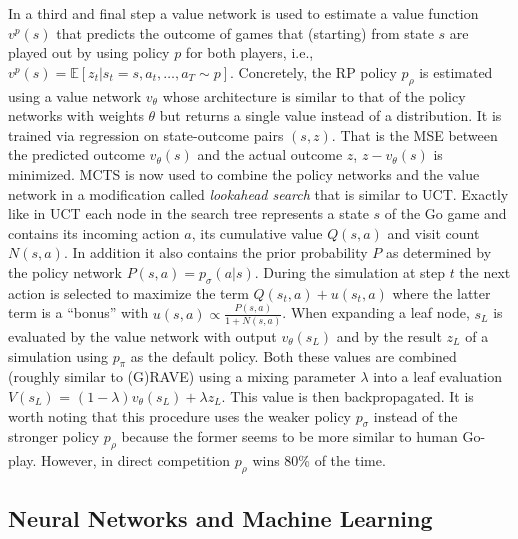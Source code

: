 In a third and final step a value network is used to estimate a value function $v^p(s)$ that predicts the outcome of games that (starting) from state $s$ are played out by using policy $p$ for both players, i.e., $v^p(s) = \mathbb{E}[z_t | s_t = s, a_t,\ldots,a_T \sim p]$. Concretely, the RP policy $p_\rho$ is estimated using a value network $v_\theta$ whose architecture is similar to that of the policy networks with weights $\theta$ but returns a single value instead of a distribution. It is trained via regression on state-outcome pairs $(s,z)$. That is the MSE between the predicted outcome $v_\theta(s)$ and the actual outcome $z$, $z-v_\theta(s)$ is minimized. MCTS is now used to combine the policy networks and the value network in a modification called \textit{lookahead search} that is similar to UCT. Exactly like in UCT each node in the search tree represents a state $s$ of the Go game and contains its incoming action $a$, its cumulative value $Q(s,a)$ and visit count $N(s,a)$. In addition it also contains the prior probability $P$ as determined by the policy network $P(s,a) = p_\sigma(a|s)$. During the simulation at step $t$ the next action is selected to maximize the term $Q(s_t,a) + u(s_t,a)$ where the latter term is a \enquote{bonus} with $u(s,a) \propto \frac{P(s,a)}{1+N(s,a)}$. When expanding a leaf node, $s_L$ is evaluated by the value network with output $v_\theta(s_L)$ and by the result $z_L$ of a simulation using $p_\pi$ as the default policy. Both these values are combined (roughly similar to (G)RAVE) using a mixing parameter $\lambda$ into a leaf evaluation $V(s_L)$ = $(1-\lambda)v_\theta(s_L)+\lambda z_L$. This value is then backpropagated. It is worth noting that this procedure uses the weaker policy $p_\sigma$ instead of the stronger policy $p_\rho$ because the former seems to be more similar to human Go-play. However, in direct competition $p_\rho$ wins 80\% of the time. 
\subsection{Neural Networks and Machine Learning}
\label{ss:nn}
